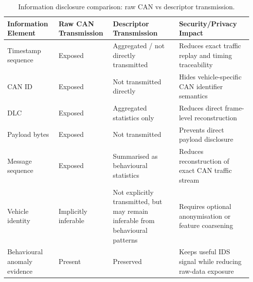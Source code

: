 \begin{table}[t]
\centering
\begin{tabular}{llll}
\toprule
Information Element & Raw CAN Transmission & Descriptor Transmission & Security/Privacy Impact \\
\midrule
Timestamp sequence & Exposed & Aggregated / not directly transmitted & Reduces exact traffic replay and timing traceability \\
CAN ID & Exposed & Not transmitted directly & Hides vehicle-specific CAN identifier semantics \\
DLC & Exposed & Aggregated statistics only & Reduces direct frame-level reconstruction \\
Payload bytes & Exposed & Not transmitted & Prevents direct payload disclosure \\
Message sequence & Exposed & Summarised as behavioural statistics & Reduces reconstruction of exact CAN traffic stream \\
Vehicle identity & Implicitly inferable & Not explicitly transmitted, but may remain inferable from behavioural patterns & Requires optional anonymisation or feature coarsening \\
Behavioural anomaly evidence & Present & Preserved & Keeps useful IDS signal while reducing raw-data exposure \\
\bottomrule
\end{tabular}
\caption{Information disclosure comparison: raw CAN vs descriptor transmission.}
\label{tab:information-disclosure}
\end{table}
